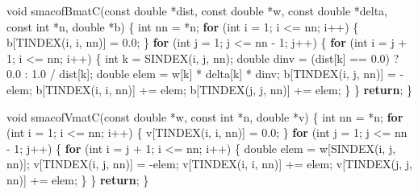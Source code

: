 \documentclass[12pt,]{article}
\newenvironment{Shaded}{\begin{snugshade}}{\end{snugshade}}
\newcommand{\DataTypeTok}[1]{\textcolor[rgb]{0.13,0.29,0.53}{#1}}
\newcommand{\DecValTok}[1]{\textcolor[rgb]{0.00,0.00,0.81}{#1}}
\newcommand{\FloatTok}[1]{\textcolor[rgb]{0.00,0.00,0.81}{#1}}
\newcommand{\ControlFlowTok}[1]{\textcolor[rgb]{0.13,0.29,0.53}{\textbf{#1}}}
\newcommand{\NormalTok}[1]{#1}
\begin{document}
\begin{Shaded}
\begin{Highlighting}[]
\DataTypeTok{void}\NormalTok{ smacofBmatC(}\DataTypeTok{const} \DataTypeTok{double}\NormalTok{ *dist, }\DataTypeTok{const} \DataTypeTok{double}\NormalTok{ *w, }\DataTypeTok{const} \DataTypeTok{double}\NormalTok{ *delta,}
                 \DataTypeTok{const} \DataTypeTok{int}\NormalTok{ *n, }\DataTypeTok{double}\NormalTok{ *b) \{}
    \DataTypeTok{int}\NormalTok{ nn = *n;}
    \ControlFlowTok{for}\NormalTok{ (}\DataTypeTok{int}\NormalTok{ i = }\DecValTok{1}\NormalTok{; i <= nn; i++) \{}
\NormalTok{        b[TINDEX(i, i, nn)] = }\FloatTok{0.0}\NormalTok{;}
\NormalTok{    \}}
    \ControlFlowTok{for}\NormalTok{ (}\DataTypeTok{int}\NormalTok{ j = }\DecValTok{1}\NormalTok{; j <= nn - }\DecValTok{1}\NormalTok{; j++) \{}
        \ControlFlowTok{for}\NormalTok{ (}\DataTypeTok{int}\NormalTok{ i = j + }\DecValTok{1}\NormalTok{; i <= nn; i++) \{}
            \DataTypeTok{int}\NormalTok{ k = SINDEX(i, j, nn);}
            \DataTypeTok{double}\NormalTok{ dinv = (dist[k] == }\FloatTok{0.0}\NormalTok{) ? }\FloatTok{0.0}\NormalTok{ : }\FloatTok{1.0}\NormalTok{ / dist[k];}
            \DataTypeTok{double}\NormalTok{ elem = w[k] * delta[k] * dinv;}
\NormalTok{            b[TINDEX(i, j, nn)] = -elem;}
\NormalTok{            b[TINDEX(i, i, nn)] += elem;}
\NormalTok{            b[TINDEX(j, j, nn)] += elem;}
\NormalTok{        \}}
\NormalTok{    \}}
    \ControlFlowTok{return}\NormalTok{;}
\NormalTok{\}}

\DataTypeTok{void}\NormalTok{ smacofVmatC(}\DataTypeTok{const} \DataTypeTok{double}\NormalTok{ *w, }\DataTypeTok{const} \DataTypeTok{int}\NormalTok{ *n, }\DataTypeTok{double}\NormalTok{ *v) \{}
    \DataTypeTok{int}\NormalTok{ nn = *n;}
    \ControlFlowTok{for}\NormalTok{ (}\DataTypeTok{int}\NormalTok{ i = }\DecValTok{1}\NormalTok{; i <= nn; i++) \{}
\NormalTok{        v[TINDEX(i, i, nn)] = }\FloatTok{0.0}\NormalTok{;}
\NormalTok{    \}}
    \ControlFlowTok{for}\NormalTok{ (}\DataTypeTok{int}\NormalTok{ j = }\DecValTok{1}\NormalTok{; j <= nn - }\DecValTok{1}\NormalTok{; j++) \{}
        \ControlFlowTok{for}\NormalTok{ (}\DataTypeTok{int}\NormalTok{ i = j + }\DecValTok{1}\NormalTok{; i <= nn; i++) \{}
            \DataTypeTok{double}\NormalTok{ elem = w[SINDEX(i, j, nn)];}
\NormalTok{            v[TINDEX(i, j, nn)] = -elem;}
\NormalTok{            v[TINDEX(i, i, nn)] += elem;}
\NormalTok{            v[TINDEX(j, j, nn)] += elem;}
\NormalTok{        \}}
\NormalTok{    \}}
    \ControlFlowTok{return}\NormalTok{;}
\NormalTok{\}}


\end{Highlighting}
\end{Shaded}
\end{document}
